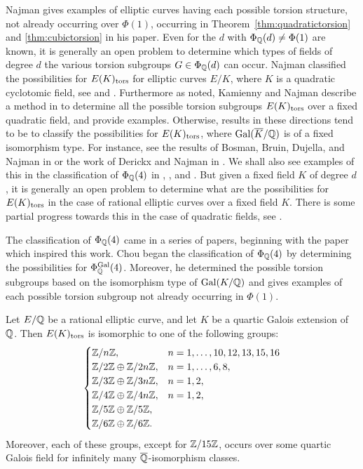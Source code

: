 Najman gives examples of elliptic curves having each possible torsion structure, not already occurring over $\Phi(1)$, occurring in Theorem~\ref{thm:quadratictorsion} and \ref{thm:cubictorsion} in his paper. Even for the $d$ with $\Phi_{\mathbb{Q}}(d) \neq \Phi(1)$ are known, it is generally an open problem to determine which types of fields of degree $d$ the various torsion subgroups $G \in \Phi_{\mathbb{Q}}(d)$ can occur. Najman classified the possibilities for $E(K)_{\text{tors}}$ for elliptic curves $E/K$, where $K$ is a quadratic cyclotomic field, see \cite{najman11cyclo} and \cite{najman10}. Furthermore as noted, Kamienny and Najman describe a method in \cite{kamiennynajman11} to determine all the possible torsion subgroups $E(K)_{\text{tors}}$ over a fixed quadratic field, and provide examples. Otherwise, results in these directions tend to be to classify the possibilities for $E(K)_{\text{tors}}$, where $\operatorname{Gal}(\overline{K}/\mathbb{Q})$ is of a fixed isomorphism type. For instance, see the results of Bosman, Bruin, Dujella, and Najman in \cite{bosmanbruindujellanajman14} or the work of Derickx and Najman in \cite{derickxnajman19}. We shall also see examples of this in the classification of $\Phi_{\mathbb{Q}}(4)$ in \cite{chou16}, \cite{gonzalezjimenezlozanorobledo18}, and \cite{gonzalezjimeneznajman20base}. But given a fixed field $K$ of degree $d$, it is generally an open problem to determine what are the possibilities for $E(K)_{\text{tors}}$ in the case of rational elliptic curves over a fixed field $K$. There is some partial progress towards this in the case of quadratic fields, see \cite{trbovic18}. 


The classification of $\Phi_{\mathbb{Q}}(4)$ came in a series of papers, beginning with the paper which inspired this work. Chou began the classification of $\Phi_{\mathbb{Q}}(4)$ by determining the possibilities for $\Phi_{\mathbb{Q}}^{\operatorname{Gal}}(4)$. Moreover, he determined the possible torsion subgroups based on the isomorphism type of $\operatorname{Gal}(K/\mathbb{Q})$ and gives examples of each possible torsion subgroup not already occurring in $\Phi(1)$.


\begin{thm}
Let $E/\mathbb{Q}$ be a rational elliptic curve, and let $K$ be a quartic Galois extension of $\mathbb{Q}$. Then $E(K)_{\text{tors}}$ is isomorphic to one of the following groups:
	\[
	\begin{cases}
	\mathbb{Z}/n\mathbb{Z}, & n= 1,\ldots, 10, 12, 13, 15, 16 \\
	\mathbb{Z}/2\mathbb{Z} \oplus \mathbb{Z}/2n\mathbb{Z}, & n= 1, \ldots, 6, 8, \\
	\mathbb{Z}/3\mathbb{Z} \oplus \mathbb{Z}/3n\mathbb{Z}, & n= 1, 2, \\
	\mathbb{Z}/4\mathbb{Z} \oplus \mathbb{Z}/4n\mathbb{Z}, & n= 1, 2, \\
	\mathbb{Z}/5\mathbb{Z} \oplus \mathbb{Z}/5\mathbb{Z}, \\
	\mathbb{Z}/6\mathbb{Z} \oplus \mathbb{Z}/6\mathbb{Z}.
	\end{cases}
	\]
Moreover, each of these groups, except for $\mathbb{Z}/15\mathbb{Z}$, occurs over some quartic Galois field for infinitely many $\overline{\mathbb{Q}}$-isomorphism classes.
\end{thm}


